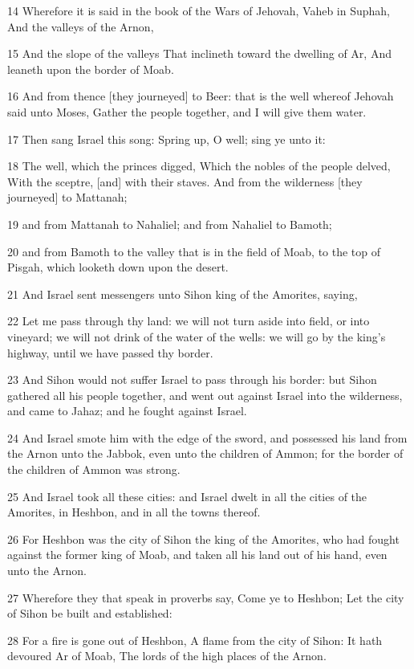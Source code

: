 \par 14 Wherefore it is said in the book of the Wars of Jehovah, Vaheb in Suphah, And the valleys of the Arnon,
\par 15 And the slope of the valleys That inclineth toward the dwelling of Ar, And leaneth upon the border of Moab.
\par 16 And from thence [they journeyed] to Beer: that is the well whereof Jehovah said unto Moses, Gather the people together, and I will give them water.
\par 17 Then sang Israel this song: Spring up, O well; sing ye unto it:
\par 18 The well, which the princes digged, Which the nobles of the people delved, With the sceptre, [and] with their staves. And from the wilderness [they journeyed] to Mattanah;
\par 19 and from Mattanah to Nahaliel; and from Nahaliel to Bamoth;
\par 20 and from Bamoth to the valley that is in the field of Moab, to the top of Pisgah, which looketh down upon the desert.
\par 21 And Israel sent messengers unto Sihon king of the Amorites, saying,
\par 22 Let me pass through thy land: we will not turn aside into field, or into vineyard; we will not drink of the water of the wells: we will go by the king's highway, until we have passed thy border.
\par 23 And Sihon would not suffer Israel to pass through his border: but Sihon gathered all his people together, and went out against Israel into the wilderness, and came to Jahaz; and he fought against Israel.
\par 24 And Israel smote him with the edge of the sword, and possessed his land from the Arnon unto the Jabbok, even unto the children of Ammon; for the border of the children of Ammon was strong.
\par 25 And Israel took all these cities: and Israel dwelt in all the cities of the Amorites, in Heshbon, and in all the towns thereof.
\par 26 For Heshbon was the city of Sihon the king of the Amorites, who had fought against the former king of Moab, and taken all his land out of his hand, even unto the Arnon.
\par 27 Wherefore they that speak in proverbs say, Come ye to Heshbon; Let the city of Sihon be built and established:
\par 28 For a fire is gone out of Heshbon, A flame from the city of Sihon: It hath devoured Ar of Moab, The lords of the high places of the Arnon.
